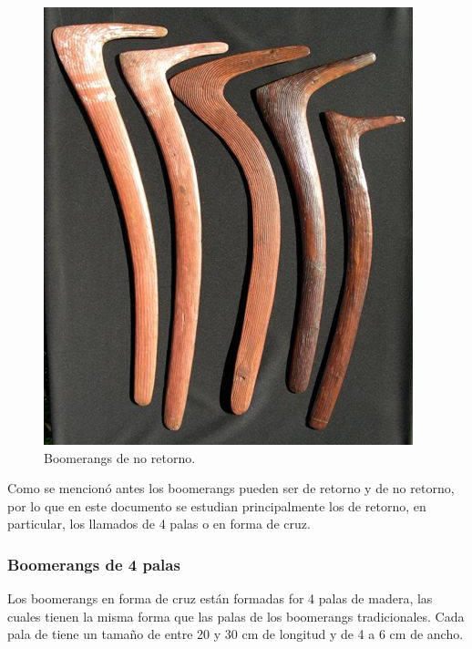 	\begin{figure}[h]
		\begin{center}
		\includegraphics[scale=1]{imagenes/3-boomerang/boomerang_de_no_regreso.jpg}
		\caption{Boomerangs de no retorno.}
   	    \label{fig1}
		\end{center}
	\end{figure}

	Como se mencionó antes los boomerangs pueden ser de retorno y de no retorno, por lo que en este documento se estudian principalmente los de retorno, en particular, los llamados de 4 palas o en forma de cruz.

  \subsubsection*{Boomerangs de 4 palas}

  	Los boomerangs en forma de cruz están formadas for 4 palas de madera, las cuales tienen la misma forma que las palas de los boomerangs tradicionales.  Cada pala de tiene un tamaño de entre 20 y 30 cm de longitud y de 4 a 6 cm de ancho.

